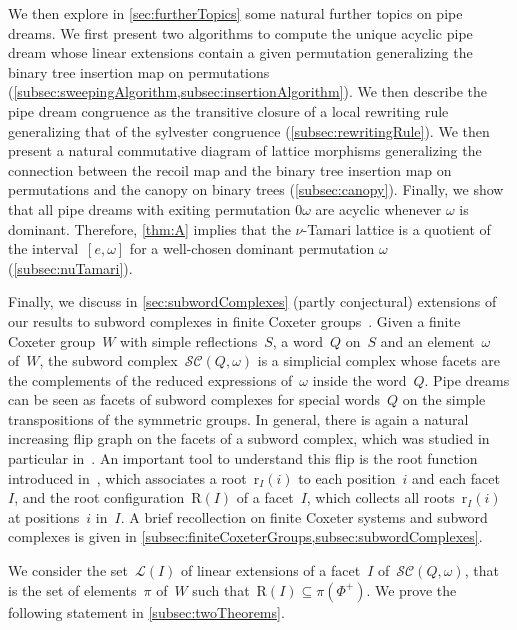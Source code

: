 \documentclass[reqno]{amsart}
\theoremstyle{definition}
\newcommand{\linearExtensions}{\mathcal{L}} %
\newcommand{\subwordComplex}{\mathcal{SC}} %
\newcommand{\Roots}{\mathrm{R}} %
\newcommand{\rootFunction}[2]{\mathrm{r}_{#1}(#2)} %
\begin{document}
We then explore in \cref{sec:furtherTopics} some natural further topics on pipe dreams.
We first present two algorithms to compute the unique acyclic pipe dream whose linear extensions contain a given permutation generalizing the binary tree insertion map on permutations (\cref{subsec:sweepingAlgorithm,subsec:insertionAlgorithm}).
We then describe the pipe dream congruence as the transitive closure of a local rewriting rule generalizing that of the sylvester congruence (\cref{subsec:rewritingRule}).
We then present a natural commutative diagram of lattice morphisms generalizing the connection between the recoil map and the binary tree insertion map on permutations and the canopy on binary trees (\cref{subsec:canopy}).
Finally, we show that all pipe dreams with exiting permutation $0\omega$ are acyclic whenever $\omega$ is dominant. Therefore, \cref{thm:A} implies that the $\nu$-Tamari lattice is a quotient of the interval~$[e,\omega]$ for a well-chosen dominant permutation $\omega$ (\cref{subsec:nuTamari}).

Finally, we discuss in \cref{sec:subwordComplexes} (partly conjectural) extensions of our results to subword complexes in finite Coxeter groups~\cite{KnutsonMiller-subwordComplex}.
Given a finite Coxeter group~$W$ with simple reflections~$S$, a word~$Q$ on~$S$ and an element~$\omega$ of~$W$, the subword complex~$\subwordComplex(Q,\omega)$ is a simplicial complex whose facets are the complements of the reduced expressions of~$\omega$ inside the word~$Q$.
Pipe dreams can be seen as facets of subword complexes for special words~$Q$ on the simple transpositions of the symmetric groups.
In general, there is again a natural increasing flip graph on the facets of a subword complex, which was studied in particular in~\cite{PilaudStump-ELlabelings}.
An important tool to understand this flip is the root function introduced in~\cite{CeballosLabbeStump}, which associates a root~$\rootFunction{I}{i}$ to each position~$i$ and each facet~$I$, and the root configuration~$\Roots(I)$ of a facet~$I$, which collects all roots~$\rootFunction{I}{i}$ at positions~$i$ in~$I$.
A brief recollection on finite Coxeter systems and subword complexes is given in \cref{subsec:finiteCoxeterGroups,subsec:subwordComplexes}.

We consider the set~$\linearExtensions(I)$ of linear extensions of a facet~$I$ of~$\subwordComplex(Q,\omega)$, that is the set of elements~$\pi$ of~$W$ such that~${\Roots(I) \subseteq \pi(\Phi^+)}$.
We prove the following statement in \cref{subsec:twoTheorems}.
\end{document}
